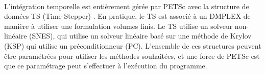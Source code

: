     \paragraph{}
    L'intégration temporelle est entièrement gérée par PETSc avec la structure de données TS (Time-Stepper) \cite{AbhyankarBrownConstantinescuEtAl2018}.
    En pratique, le TS est associé à un DMPLEX de manière à utiliser une formulation volumes finis.
    Le TS utilise un solveur non-linéaire (SNES), qui utilise un solveur linéaire basé sur une méthode de Krylov (KSP) qui utilise un préconditionneur (PC).
    L'ensemble de ces structures peuvent être paramétrées pour utiliser les méthodes souhaitées, et une force de PETSc est que ce paramétrage peut s'effectuer à l’exécution du programme.
%
